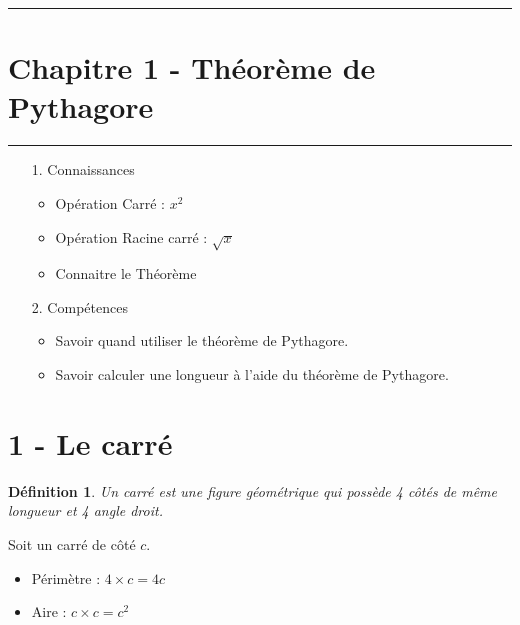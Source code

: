 \documentclass[12pt]{article}
\newcommand{\horrule}[1]{\rule{\linewidth}{#1}} %
\begin{document}

\newtheorem{Definition}{Définition}
\newtheorem{Theorem}{Théorème}
\newtheorem{Proposition}{Propriété}

\renewcommand{\labelitemi}{$\bullet$}
\renewcommand{\labelitemii}{$\circ$}

\setlength{\columnseprule}{1pt}

\horrule{2px}
\section*{Chapitre 1 - Théorème de Pythagore}
\horrule{2px}

\begin{enumerate}
	\item[1.] Connaissances
	      \begin{itemize}
		      \item Opération Carré : $x^2$
		      \item Opération Racine carré : $\sqrt{x}$
		      \item Connaitre le Théorème
	      \end{itemize}
	\item[2.] Compétences
	      \begin{itemize}
		      \item Savoir quand utiliser le théorème de Pythagore.
		      \item Savoir calculer une longueur à l'aide du théorème de Pythagore.
	      \end{itemize}
\end{enumerate}

\section*{1 - Le carré}

\begin{Definition}
	Un carré est une figure géométrique qui possède 4 côtés de même longueur et 4 angle droit.
\end{Definition}

Soit un carré de côté $c$.
\begin{itemize}
	\item Périmètre : $4 \times c = 4c$
	\item Aire : $c \times c = c^2$
\end{itemize}
\end{document}
